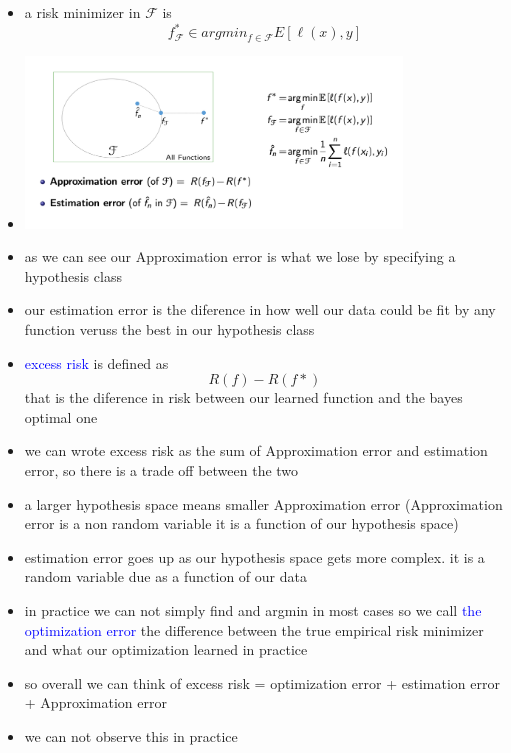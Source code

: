 \documentclass{article}
\begin{document}
\begin{itemize}
\item a risk minimizer in $\mathcal{F}$ is $$f^{*}_{\mathcal{F}}\in argmin_{f\in \mathcal{F}}E[\ell(x),y]$$
\item \includegraphics*[width=10cm]{images/Screenshot 2023-05-10 at 8.02.37 PM.png}
\item as we can see our Approximation error is what we lose by specifying a hypothesis class 
\item our estimation error is the diference in how well our data could be fit by any function veruss the best in our hypothesis class
\item \textcolor{blue}{excess risk} is defined as $$R(f)-R(f*)$$ that is the diference in risk between our learned function and the bayes optimal one 
\item we can wrote excess risk as the sum of Approximation error and estimation error, so there is a trade off between the two 
\item a larger hypothesis space means smaller Approximation error (Approximation error is a non random variable it is a function of our hypothesis space)
\item estimation error goes up as our hypothesis space gets more complex. it is a random variable due as a function of our data
\item in practice we can not simply find and argmin in most cases so we call \textcolor{blue}{the optimization error} the difference  between the true empirical risk minimizer and what our optimization learned in practice
\item so overall we can think of excess risk = optimization error + estimation error + Approximation error 
\item we can not observe this in practice
\end{itemize}
\end{document}

